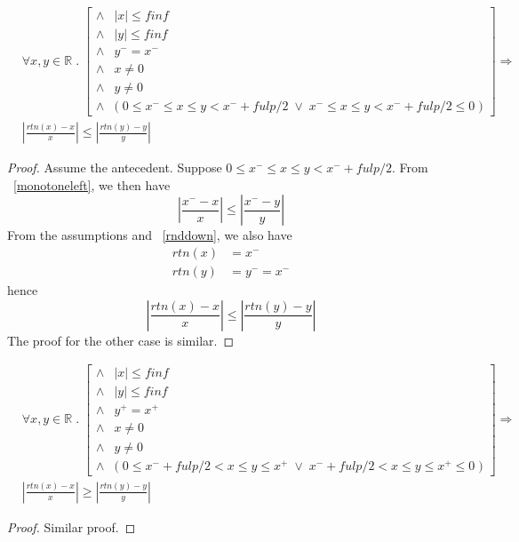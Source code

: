 \begin{lem}
\label{rtnmonoleft}
\begin{align*}
&\forall x, y \in \mathbb{R} \; . \; 
\left [
\begin{array}{cl}
\wedge & |x| \leq finf\\
\wedge & |y| \leq finf\\
\wedge & y^- = x^-\\
\wedge & x \neq 0\\
\wedge & y \neq 0\\
\wedge & \big ( \; 0 \leq x^- \leq x \leq y < x^- + fulp/2 \; \vee \;
x^- \leq x \leq y < x^- + fulp/2 \leq 0 \; \big )
\end{array} \right ]
\Longrightarrow \;\\
& \left | \frac{rtn(x) - x}{x} \right | \leq \left | \frac{rtn(y) - y}{y}
\right |
\end{align*}
\begin{proof} Assume the antecedent. Suppose $0 \leq x^- \leq x \leq y <
x^- + fulp/2$. From ~\ref{monotoneleft}, we then have
\begin{equation*}
\left | \frac{x^- - x}{x} \right | \leq \left | \frac{x^- - y}{y} \right |
\end{equation*}
From the assumptions and ~\ref{rnddown}, we also have
\begin{align*}
rtn(x) &= x^-\\
rtn(y) &= y^- = x^-
\end{align*}
hence
\begin{equation*}
\left | \frac{rtn(x) - x}{x} \right | \leq \left | \frac{rtn(y) - y}{y} \right |
\end{equation*}
The proof for the other case is similar.
\end{proof}
\end{lem}

\begin{lem}
\label{rtnmonoright}
\begin{align*}
&\forall x, y \in \mathbb{R} \; . \; 
\left [
\begin{array}{cl}
\wedge & |x| \leq finf\\
\wedge & |y| \leq finf\\
\wedge & y^+ = x^+\\
\wedge & x \neq 0\\
\wedge & y \neq 0\\
\wedge & \big ( \; 0 \leq x^- + fulp/2 < x \leq y \leq x^+ \; \vee \;
x^- + fulp/2 < x \leq y \leq x^+ \leq 0 \; \big )
\end{array} \right ]
\Longrightarrow \;\\
& \left | \frac{rtn(x) - x}{x} \right | \geq \left | \frac{rtn(y) - y}{y}
\right |
\end{align*}
\begin{proof} Similar proof.
\end{proof}
\end{lem}
